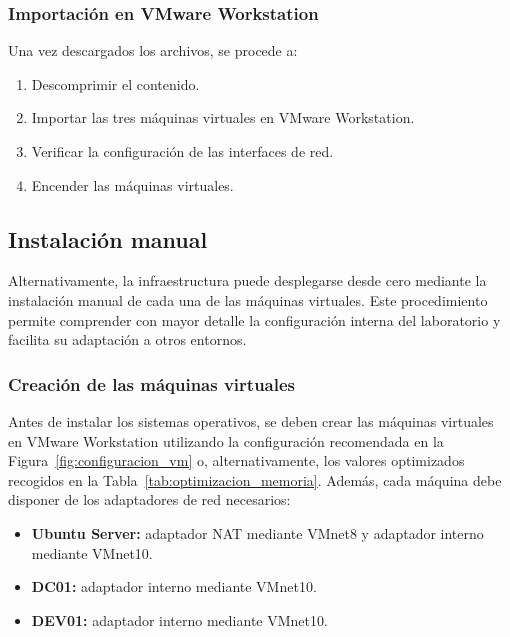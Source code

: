 \subsubsection*{Importación en VMware Workstation}

Una vez descargados los archivos, se procede a:

\begin{enumerate}
    \item Descomprimir el contenido.
    \item Importar las tres máquinas virtuales en VMware Workstation.
    \item Verificar la configuración de las interfaces de red.
    \item Encender las máquinas virtuales.
\end{enumerate}








\clearpage
\subsection*{Instalación manual}

Alternativamente, la infraestructura puede desplegarse desde cero mediante la instalación manual de cada una de las máquinas virtuales. Este procedimiento permite comprender con mayor detalle la configuración interna del laboratorio y facilita su adaptación a otros entornos.

\subsubsection*{Creación de las máquinas virtuales}

Antes de instalar los sistemas operativos, se deben crear las máquinas virtuales en VMware Workstation utilizando la configuración recomendada en la Figura~\ref{fig:configuracion_vm} o, alternativamente, los valores optimizados recogidos en la Tabla~\ref{tab:optimizacion_memoria}. Además, cada máquina debe disponer de los adaptadores de red necesarios:


\begin{itemize}
    \item \textbf{Ubuntu Server:} adaptador NAT mediante VMnet8 y adaptador interno mediante VMnet10.
    \item \textbf{DC01:} adaptador interno mediante VMnet10.
    \item \textbf{DEV01:} adaptador interno mediante VMnet10.
\end{itemize}

